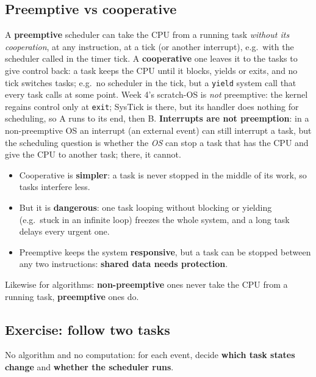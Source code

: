 \subsection{Preemptive vs cooperative}
A \textbf{preemptive} scheduler can take the CPU from a running task \emph{without its cooperation}, at any instruction, at a tick (or another interrupt), e.g.\ with the scheduler called in the timer tick. A \textbf{cooperative} one leaves it to the tasks to give control back: a task keeps the CPU until it blocks, yields or exits, and no tick switches tasks; e.g.\ no scheduler in the tick, but a \texttt{yield} system call that every task calls at some point. Week 4's scratch-OS is \emph{not} preemptive: the kernel regains control only at \texttt{exit}; SysTick is there, but its handler does nothing for scheduling, so A runs to its end, then B. \textbf{Interrupts are not preemption}: in a non-preemptive OS an interrupt (an external event) can still interrupt a task, but the scheduling question is whether the \emph{OS} can stop a task that has the CPU and give the CPU to another task; there, it cannot.
\begin{itemize}
    \item Cooperative is \textbf{simpler}: a task is never stopped in the middle of its work, so tasks interfere less.
    \item But it is \textbf{dangerous}: one task looping without blocking or yielding (e.g.\ stuck in an infinite loop) freezes the whole system, and a long task delays every urgent one.
    \item Preemptive keeps the system \textbf{responsive}, but a task can be stopped between any two instructions: \textbf{shared data needs protection}.
\end{itemize}
Likewise for algorithms: \textbf{non-preemptive} ones never take the CPU from a running task, \textbf{preemptive} ones do.

\subsection{Exercise: follow two tasks}
No algorithm and no computation: for each event, decide \textbf{which task states change} and \textbf{whether the scheduler runs}.

